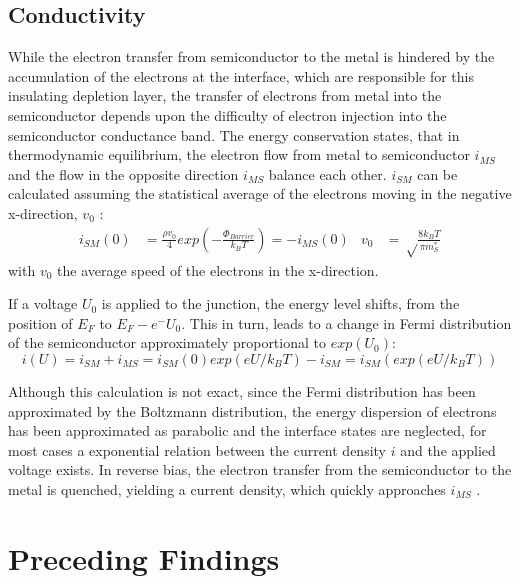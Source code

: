 \documentclass[12pt]{article}
\begin{document}
\subsection{Conductivity}
While the electron transfer from semiconductor to the metal is hindered by the accumulation of the electrons at the interface, which are responsible for this insulating depletion layer, the transfer of electrons from metal into the semiconductor depends upon the difficulty of electron injection into the semiconductor conductance band. The energy conservation states, that in thermodynamic equilibrium, the electron flow from metal to semiconductor $i_{MS}$ and the flow in the opposite direction $i _{MS}$ balance each other. $i_{SM}$ can be calculated assuming the statistical average of the electrons moving in the negative x-direction, $v_0$ \cite{Fundamentals}:
\begin{align}
i_{SM}(0) & = \frac{\rho v_0} {4} exp \left( - \frac{\Phi _{Barrier}}{k_B T} \right) = -i_{MS}(0) &
v_0 & = \sqrt\frac{8k_B T}{\pi m_S^*}
\end{align}
with $v_0$ the average speed of the electrons in the x-direction. 

If a voltage $U_0$ is applied to the junction, the energy level shifts, from the position of $E_F$ to $E_F -e^-U_0$. This in turn, leads to a change in Fermi distribution of the semiconductor approximately proportional to $exp(U_0)$:
\begin{equation}
	i(U) = i_{SM}+i_{MS} = i_{SM}(0)exp(eU/k_B T) - i_{SM} = i_{SM}(exp(eU/k_B T))
\end{equation}

Although this calculation is not exact, since the Fermi distribution has been approximated by the Boltzmann distribution, the energy dispersion of electrons has been approximated as parabolic and the interface states are neglected, for most cases a exponential relation between the current density $i$ and the applied voltage exists. In reverse bias, the electron transfer from the semiconductor to the metal is quenched, yielding a current density, which quickly approaches $i_{MS}$ \cite{Fundamentals}.

\section{Preceding Findings}
	\label{sec:Preceding}
	
\end{document}
